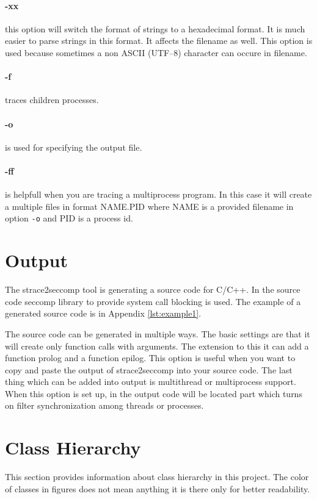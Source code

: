 \paragraph{-xx} this option will switch the format of strings to a hexadecimal format.
It is much easier to parse strings in this format. It affects the filename as well.
This option is used because sometimes a non ASCII (UTF--8) character can occure in filename.

\paragraph{-f} traces children processes.

\paragraph{-o} is used for specifying the output file.

\paragraph{-ff} is helpfull when you are tracing a multiprocess program. In this
case it will create a multiple files in format NAME.PID where NAME is a provided
filename in option \texttt{-o} and PID is a process id.

\section{Output}
The strace2seccomp tool is generating a source code for C/C++.
In the source code seccomp library to provide system call blocking is used.
The example of a generated source code is in Appendix \ref{lst:example1}.

The source code can be generated in multiple ways. The basic settings are that
it will create only function calls with arguments. The extension to this it can
add a function prolog and a function epilog. This option is useful when you want
to copy and paste the output of strace2seccomp into your source code. The last
thing which can be added into output is multithread or multiprocess support.
When this option is set up, in the output code will be located part which turns
on filter synchronization among threads or processes.

\section{Class Hierarchy}
This section provides information about class hierarchy in this project. The
color of classes in figures does not mean anything it is there only for better
readability.

